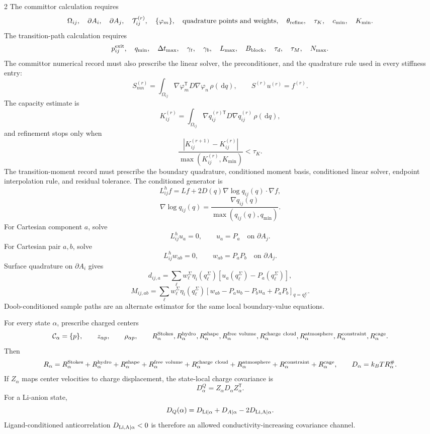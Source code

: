 \documentclass[10pt]{article}
\newcommand{\dd}{\,\mathrm d}
\newcommand{\T}{\mathsf{T}}
\begin{document}
\begin{multicols}{2}
The committor calculation requires
\[
\Omega_{ij},\quad \partial A_i,\quad \partial A_j,\quad
\mathcal T_{ij}^{(r)},\quad \{\varphi_m\},\quad
{\rm quadrature\ points\ and\ weights},\quad
\theta_{\rm refine},\quad \tau_K,\quad c_{\min},\quad K_{\min}.
\]
The transition-path calculation requires
\[
p_{ij}^{\rm exit},\quad q_{\min},\quad \Delta t_{\max},\quad
\gamma_t,\quad \gamma_b,\quad L_{\max},\quad
B_{\rm block},\quad \tau_d,\quad \tau_M,\quad N_{\max}.
\]
The committor numerical record must also prescribe the linear solver, the
preconditioner, and the quadrature rule used in every stiffness entry:
\[
S_{mn}^{(r)}
=
\int_{\Omega_{ij}}
\nabla\varphi_m^\T D\nabla\varphi_n\,\rho(\dd q),
\qquad
S^{(r)}u^{(r)}=f^{(r)}.
\]
The capacity estimate is
\[
K_{ij}^{(r)}
=
\int_{\Omega_{ij}}
\nabla q_{ij}^{(r)\T}D\nabla q_{ij}^{(r)}\,\rho(\dd q),
\]
and refinement stops only when
\[
\frac{|K_{ij}^{(r+1)}-K_{ij}^{(r)}|}
{\max(K_{ij}^{(r)},K_{\min})}
<\tau_K.
\]
The transition-moment record must prescribe the boundary quadrature, conditioned
moment basis, conditioned linear solver, endpoint interpolation rule, and
residual tolerance. The conditioned generator is
\[
L_{ij}^h f
=
L f+2D(q)\nabla\log q_{ij}(q)\cdot\nabla f,
\]
\[
\nabla\log q_{ij}(q)
=
\frac{\nabla q_{ij}(q)}{\max(q_{ij}(q),q_{\min})}.
\]
For Cartesian component \(a\), solve
\[
L_{ij}^h u_a=0,
\qquad
u_a=P_a\quad\text{on }\partial A_j.
\]
For Cartesian pair \(a,b\), solve
\[
L_{ij}^h w_{ab}=0,
\qquad
w_{ab}=P_aP_b\quad\text{on }\partial A_j.
\]
Surface quadrature on \(\partial A_i\) gives
\[
d_{ij,a}=
\sum_\ell w_\ell^\Sigma\eta_i(q_\ell^\Sigma)
[u_a(q_\ell^\Sigma)-P_a(q_\ell^\Sigma)],
\]
\[
M_{ij,ab}=
\sum_\ell w_\ell^\Sigma\eta_i(q_\ell^\Sigma)
\left[
w_{ab}-P_au_b-P_bu_a+P_aP_b
\right]_{q=q_\ell^\Sigma}.
\]
Doob-conditioned sample paths are an alternate estimator for the same local
boundary-value equations.

For every state \(\alpha\), prescribe charged centers
\[
\mathcal C_\alpha=\{p\},
\qquad
z_{\alpha p},\qquad
\rho_{\alpha p},\qquad
R_\alpha^{\rm Stokes},R_\alpha^{\rm hydro},R_\alpha^{\rm shape},
R_\alpha^{\rm free\ volume},R_\alpha^{\rm charge\ cloud},
R_\alpha^{\rm atmosphere},R_\alpha^{\rm constraint},R_\alpha^{\rm cage}.
\]
Then
\[
R_\alpha
=
R_\alpha^{\rm Stokes}
+R_\alpha^{\rm hydro}
+R_\alpha^{\rm shape}
+R_\alpha^{\rm free\ volume}
+R_\alpha^{\rm charge\ cloud}
+R_\alpha^{\rm atmosphere}
+R_\alpha^{\rm constraint}
+R_\alpha^{\rm cage},
\qquad
D_\alpha=k_BT R_\alpha^\#.
\]
If \(Z_\alpha\) maps center velocities to charge displacement, the state-local
charge covariance is
\[
D_\alpha^Q=Z_\alpha D_\alpha Z_\alpha^\T.
\]
For a Li-anion state,
\[
D_Q(\alpha)=D_{\rm Li|\alpha}+D_{A|\alpha}-2D_{\rm Li,A|\alpha}.
\]
Ligand-conditioned anticorrelation \(D_{\rm Li,A|\alpha}<0\) is therefore an
allowed conductivity-increasing covariance channel.


\end{multicols}
\end{document}
